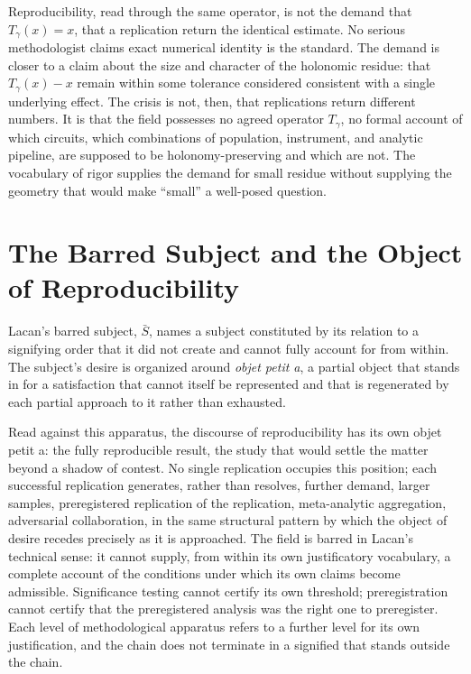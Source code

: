 Reproducibility, read through the same operator, is not the demand that $T_\gamma(x) = x$, that a replication return the identical estimate. No serious methodologist claims exact numerical identity is the standard. The demand is closer to a claim about the size and character of the holonomic residue: that $T_\gamma(x) - x$ remain within some tolerance considered consistent with a single underlying effect. The crisis is not, then, that replications return different numbers. It is that the field possesses no agreed operator $T_\gamma$, no formal account of which circuits, which combinations of population, instrument, and analytic pipeline, are supposed to be holonomy-preserving and which are not. The vocabulary of rigor supplies the demand for small residue without supplying the geometry that would make ``small'' a well-posed question.

\section{The Barred Subject and the Object of Reproducibility}

Lacan's barred subject, $\bar{S}$, names a subject constituted by its relation to a signifying order that it did not create and cannot fully account for from within. The subject's desire is organized around \emph{objet petit a}, a partial object that stands in for a satisfaction that cannot itself be represented and that is regenerated by each partial approach to it rather than exhausted.

Read against this apparatus, the discourse of reproducibility has its own objet petit a: the fully reproducible result, the study that would settle the matter beyond a shadow of contest. No single replication occupies this position; each successful replication generates, rather than resolves, further demand, larger samples, preregistered replication of the replication, meta-analytic aggregation, adversarial collaboration, in the same structural pattern by which the object of desire recedes precisely as it is approached. The field is barred in Lacan's technical sense: it cannot supply, from within its own justificatory vocabulary, a complete account of the conditions under which its own claims become admissible. Significance testing cannot certify its own threshold; preregistration cannot certify that the preregistered analysis was the right one to preregister. Each level of methodological apparatus refers to a further level for its own justification, and the chain does not terminate in a signified that stands outside the chain.

